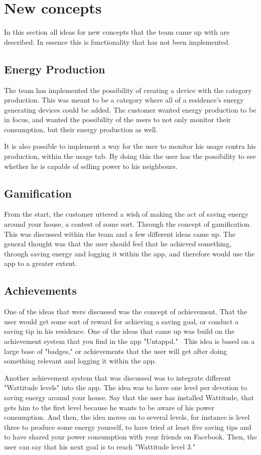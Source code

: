 \section{New concepts}
In this section all ideas for new concepts that the team came up with are described. In essence this is functionality that has not been implemented.

\subsection{Energy Production}
The team has implemented the possibility of creating a device with the category production. This was meant to be a category where all of a residence's energy generating devices could be added. The customer wanted energy production to be in focus, and wanted the possibility of the users to not only monitor their consumption, but their energy production as well. 

It is also possible to implement a way for the user to monitor his usage contra his production, within the usage tab. By doing this the user has the possibility to see whether he is capable of selling power to his neighbours. 

\subsection{Gamification}
From the start, the customer uttered a wish of making the act of saving energy around your house, a contest of some sort. Through the concept of gamification. This was discussed within the team and a few different ideas came up. The general thought was that the user should feel that he achieved something, through saving energy and logging it within the app, and therefore would use the app to a greater extent. 

\subsection{Achievements}
One of the ideas that were discussed was the concept of achievement. That the user would get some sort of reward for achieving a saving goal, or conduct a saving tip in his residence. One of the ideas that came up was build on the achievement system that you find in the app "Untappd."~\cite{untappd}
This idea is based on a large base of "badges," or achievements that the user will get after doing something relevant and logging it within the app. 

Another achievement system that was discussed was to integrate different "Wattitude levels" into the app. The idea was to have one level per devotion to saving energy around your house. Say that the user has installed Wattitude, that gets him to the first level because he wants to be aware of his power consumption. And then, the idea moves on to several levels, for instance is level three to produce some energy yourself, to have tried at least five saving tips and to have shared your power consumption with your friends on Facebook. Then, the user can say that his next goal is to reach "Wattitude level 3."


